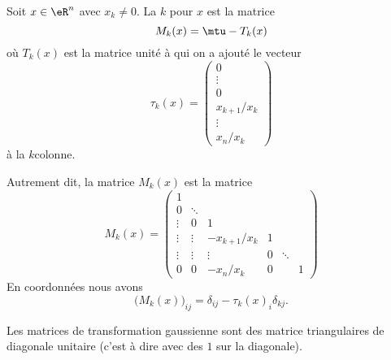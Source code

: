 \begin{definition}
    Soit \( x\in \eR^n\) avec \( x_k\neq 0\). La \( k\)\ieme {} pour \( x\) est la matrice
    \begin{equation}
        M_k(x)=\mtu-T_k(x)
    \end{equation}
    où \( T_k(x)\) est la matrice unité à qui on a ajouté le vecteur
    \begin{equation}
        \tau_k(x)=
        \begin{pmatrix}
            0    \\ 
            \vdots    \\ 
            0    \\ 
            x_{k+1}/x_k    \\ 
            \vdots    \\ 
            x_n/x_k    
        \end{pmatrix}
    \end{equation}
    à la \( k\)\ieme colonne. 
\end{definition}
Autrement dit, la matrice \( M_k(x)\) est la matrice 
\begin{equation}        \label{EQooMWXLooBDtsKS}
    M_k(x)=\begin{pmatrix}
        1    &       &       &       &       &   \\  
        0    &    \ddots    &                 &       &       &   \\
        \vdots    &   0    &   1               &         &       &   \\
        \vdots    & \vdots      &   -x_{k+1}/x_k    &   1    &       &   \\
        \vdots    &   \vdots    &   \vdots    &   0    &   \ddots    &   \\
        0    &   0    &           -x_n/x_k   &  0   &      &   1
    \end{pmatrix}
\end{equation}
En coordonnées nous avons
\begin{equation}
    \big( M_k(x)\big)_{ij}=\delta_{ij}-\tau_k(x)_i\delta_{kj}.
\end{equation}

\begin{normaltext}
    Les matrices de transformation gaussienne sont des matrice triangulaires de diagonale unitaire (c'est à dire avec des \( 1\) sur la diagonale).
\end{normaltext}

